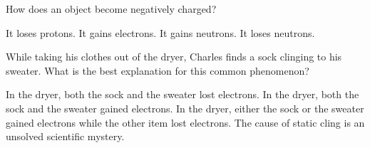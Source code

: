 \documentclass[]{exam}
\begin{document}
\begin{questions}
\question
How does an object become negatively charged?

\begin{randomizechoices}
    \choice It loses protons.
    \correctchoice It gains electrons.
    \choice It gains neutrons.
    \choice It loses neutrons.
\end{randomizechoices}



\question
While taking his clothes out of the dryer, Charles finds a sock clinging to his sweater. What is the best explanation for this common phenomenon? 

\begin{randomizechoices}[keeplast]
    \choice In the dryer, both the sock and the sweater lost electrons.
    \choice In the dryer, both the sock and the sweater gained electrons.
    \correctchoice In the dryer, either the sock or the sweater gained electrons while the other item lost electrons.
    \choice The cause of static cling is an unsolved scientific mystery.
\end{randomizechoices}




\end{questions}
\end{document}
